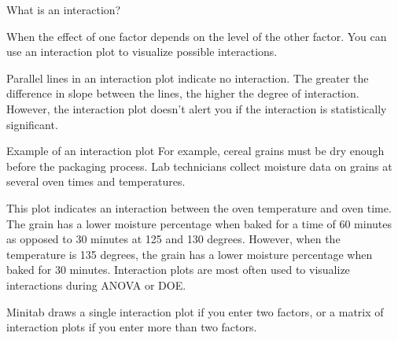 What is an interaction?


When the effect of one factor depends on the level of the other factor. You can use an interaction plot to visualize possible interactions.

Parallel lines in an interaction plot indicate no interaction. The greater the difference in slope between the lines, the higher the degree of interaction. However, the interaction plot doesn't alert you if the interaction is statistically significant.

Example of an interaction plot
For example, cereal grains must be dry enough before the packaging process. Lab technicians collect moisture data on grains at several oven times and temperatures.


This plot indicates an interaction between the oven temperature and oven time. The grain has a lower moisture percentage when baked for a time of 60 minutes as opposed to 30 minutes at 125 and 130 degrees. However, when the temperature is 135 degrees, the grain has a lower moisture percentage when baked for 30 minutes.
Interaction plots are most often used to visualize interactions during ANOVA or DOE.

Minitab draws a single interaction plot if you enter two factors, or a matrix of interaction plots if you enter more than two factors.
